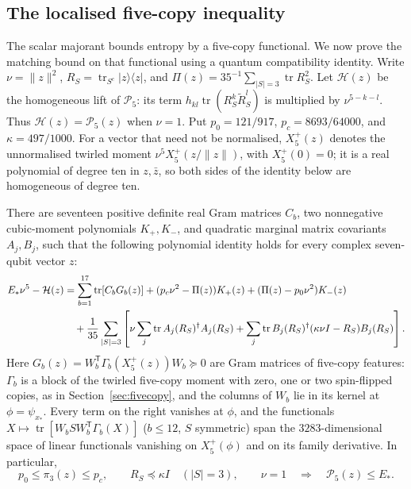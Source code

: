 \subsection{The localised five-copy inequality}
\label{sec:seven-entropy-certificate}

The scalar majorant bounds entropy by a five-copy functional. We now prove the matching bound on that
functional using a quantum compatibility identity.
Write $\nu=\|z\|^2$, $R_S=\operatorname{tr}_{S^c}|z\rangle\langle z|$,
and $\Pi(z)=35^{-1}\sum_{|S|=3}\operatorname{tr}R_S^2$.
Let $\mathcal H(z)$ be the homogeneous lift of
$\mathcal P_5$: its term $h_{kl}\operatorname{tr}(R_S^k\widetilde R_S^l)$
is multiplied by $\nu^{5-k-l}$. Thus
$\mathcal H(z)=\mathcal P_5(z)$ when $\nu=1$.
Put $p_0=121/917$, $p_c=8693/64000$, and $\kappa=497/1000$.
For a vector that need not be normalised, $X_5^+(z)$ denotes the unnormalised twirled moment
$\nu^5X_5^+(z/\|z\|)$, with $X_5^+(0)=0$; it is a real polynomial of degree ten in $z,\bar z$, so both sides
of the identity below are homogeneous of degree ten.

\begin{theorem}
\label{thm:seven-entropy-localized-identity}
There are seventeen positive definite real Gram matrices $C_b$, two
nonnegative cubic-moment polynomials $K_+,K_-$, and quadratic marginal
matrix covariants $A_j,B_j$, such that the following polynomial identity
holds for every complex seven-qubit vector $z$:
\begin{align}
 E_*\nu^5-\mathcal H(z)
 &=\sum_{b=1}^{17}\operatorname{tr}[C_bG_b(z)]
   +(p_c\nu^2-\Pi(z))K_+(z)
   +(\Pi(z)-p_0\nu^2)K_-(z)\notag\\
 &\quad+\frac1{35}\sum_{|S|=3}\left[
       \nu\sum_j\operatorname{tr} A_j(R_S)^\dagger A_j(R_S)
       +\sum_j\operatorname{tr}B_j(R_S)^\dagger
                   (\kappa\nu I-R_S)B_j(R_S)\right].
 \label{eq:seven-entropy-localized-identity}
\end{align}
Here $G_b(z)=W_b^{\mathsf T}\Gamma_b(X_5^+(z))W_b\succeq0$ are Gram
matrices of five-copy features: $\Gamma_b$ is a block of the twirled
five-copy moment with zero, one or two spin-flipped copies, as in
Section~\ref{sec:fivecopy}, and the columns of $W_b$ lie in its kernel at
$\phi=\psi_{x_*}$. Every term on the right vanishes at $\phi$, and the
functionals $X\mapsto\operatorname{tr}[W_bSW_b^{\mathsf T}\Gamma_b(X)]$
($b\le12$, $S$ symmetric) span the $3283$-dimensional space of linear
functionals vanishing on $X_5^+(\phi)$ and on its family derivative. In
particular,
\begin{equation}\label{eq:seven-entropy-compatible-bound}
 p_0\le\pi_3(z)\le p_c,\qquad R_S\preceq\kappa I\quad(|S|=3),
 \qquad \nu=1
 \quad\Longrightarrow\quad \mathcal P_5(z)\le E_*.
\end{equation}
\end{theorem}

